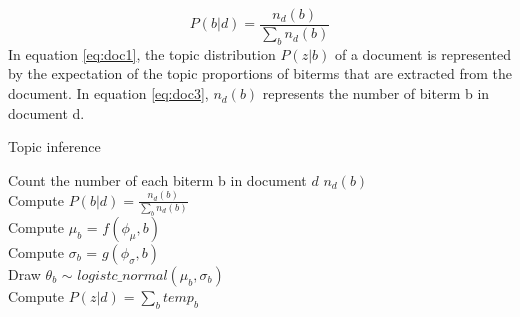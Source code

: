 \begin{equation}
    P(b|d) = \frac{n_d(b)}{\sum_bn_d(b)}
\label{eq:doc3}
\end{equation}
In equation \ref{eq:doc1}, the topic distribution $P(z|b)$ of a document is represented by the expectation of the topic proportions of biterms that are extracted from the document. In equation \ref{eq:doc3}, $n_d(b)$ represents the number of biterm b in document d.
\begin{algorithm}[!htbp]
    \caption{Topic inference}
    \LinesNumbered
    Count the number of each biterm b in document $d$ $n_d(b)$\\
    {
        Compute $P(b|d) = \frac{n_d(b)}{\sum_bn_d(b)}$\\
        Compute $\mu_b$ = $f(\phi_{\mu},b)$\\
        Compute $\sigma_b$ = $g(\phi_{\sigma},b)$\\ 
        Draw $\theta_b$ $\sim$ $logistc\_normal(\mu_b,\sigma_b)$\\
    }
    {
        Compute $P(z|d) = \sum_b temp_b$
    }
    
\end{algorithm}
